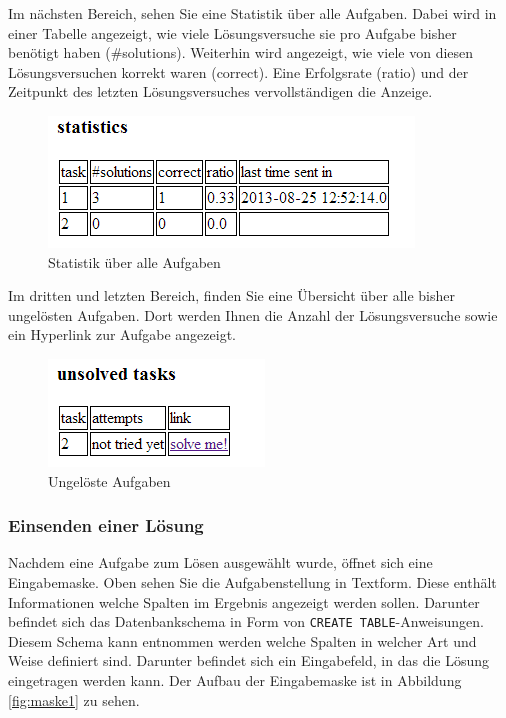 \documentclass[12pt]{scrreprt}
\theoremstyle{remark}
\begin{document}
Im nächsten Bereich, sehen Sie eine Statistik über alle Aufgaben. Dabei wird in einer Tabelle angezeigt, wie viele Lösungsversuche sie pro Aufgabe bisher benötigt haben (\#solutions). Weiterhin wird angezeigt, wie viele von diesen Lösungsversuchen korrekt waren (correct). Eine Erfolgsrate (ratio) und der Zeitpunkt des letzten Lösungsversuches vervollständigen die Anzeige.

\begin{figure}[H]
\centering
\includegraphics[scale=0.7]{Bilder/screen_user_2.png}
\caption{Statistik über alle Aufgaben}
\end{figure}

Im dritten und letzten Bereich, finden Sie eine Übersicht über alle bisher ungelösten Aufgaben. Dort werden Ihnen die Anzahl der Lösungsversuche sowie ein Hyperlink zur Aufgabe angezeigt.

\begin{figure}[H]
\centering
\includegraphics[scale=0.7]{Bilder/screen_user_3.png}
\caption{Ungelöste Aufgaben}
\end{figure}

\subsubsection{Einsenden einer Lösung}

Nachdem eine Aufgabe zum Lösen ausgewählt wurde, öffnet sich eine Eingabemaske. Oben sehen Sie die Aufgabenstellung in Textform. Diese enthält Informationen welche Spalten im Ergebnis angezeigt werden sollen. Darunter befindet sich das Datenbankschema in Form von \verb|CREATE TABLE|-Anweisungen. Diesem Schema kann entnommen werden welche Spalten in welcher Art und Weise definiert sind. Darunter befindet sich ein Eingabefeld, in das die Lösung eingetragen werden kann. Der Aufbau der Eingabemaske ist in Abbildung \ref{fig:maske1} zu sehen.
\end{document}
